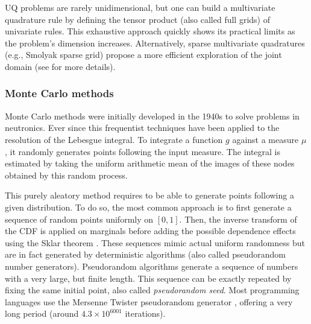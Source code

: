 
UQ problems are rarely unidimensional, but one can build a multivariate quadrature rule by defining the tensor product (also called full grids) of univariate rules. 
This exhaustive approach quickly shows its practical limits as the problem's dimension increases. 
Alternatively, sparse multivariate quadratures (e.g., Smolyak sparse grid) propose a more efficient exploration of the joint domain (see  for more details).




\subsubsection{Monte Carlo methods}
Monte Carlo methods were initially developed in the 1940s to solve problems in neutronics.  
Ever since this frequentist techniques have been applied to the resolution of the Lebesgue integral. 
To integrate a function $g$ against a measure $\mu$, it randomly generates points following the input measure. 
The integral is estimated by taking the uniform arithmetic mean of the images of these nodes obtained by this random process. 

This purely aleatory method requires to be able to generate points following a given distribution. 
To do so, the most common approach is to first generate a sequence of random points uniformly on $[0, 1]$. 
Then, the inverse transform of the CDF is applied on marginals before adding the possible dependence effects using the Sklar theorem .
These sequences mimic actual uniform randomness but are in fact generated by deterministic algorithms (also called pseudorandom number generators).
Pseudorandom algorithms generate a sequence of numbers with a very large, but finite length. 
This sequence can be exactly repeated by fixing the same initial point, also called \textit{pseudorandom seed}.
Most programming languages use the Mersenne Twister pseudorandom generator , offering a very long period (around $4.3\times10^{6001}$ iterations).


